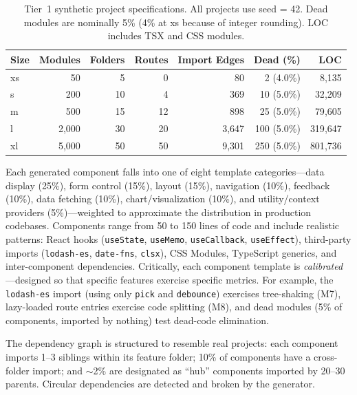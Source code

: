 \documentclass[preprint,12pt]{elsarticle}
\begin{document}
\begin{table}[htbp]
\centering
\caption{Tier~1 synthetic project specifications. All projects use seed = 42. Dead modules are nominally 5\% (4\% at xs because of integer rounding). LOC includes TSX and CSS modules.}\label{tab:projects}
\begin{tabular}{@{}lrrrrrr@{}}
\toprule
\textbf{Size} & \textbf{Modules} & \textbf{Folders} & \textbf{Routes} & \textbf{Import Edges} & \textbf{Dead (\%)} & \textbf{LOC} \\
\midrule
xs   &     50 &  5 &   0 &     80 &  2 (4.0\%) &    8{,}135 \\
s    &    200 & 10 &   4 &    369 & 10 (5.0\%) &   32{,}209 \\
m    &    500 & 15 &  12 &    898 & 25 (5.0\%) &   79{,}605 \\
l    &  2{,}000 & 30 &  20 &  3{,}647 & 100 (5.0\%) &  319{,}647 \\
xl   &  5{,}000 & 50 &  50 &  9{,}301 & 250 (5.0\%) &  801{,}736 \\
\bottomrule
\end{tabular}
\end{table}

Each generated component falls into one of eight template categories---data display (25\%), form control (15\%), layout (15\%), navigation (10\%), feedback (10\%), data fetching (10\%), chart/visualization (10\%), and utility/context providers (5\%)---weighted to approximate the distribution in production codebases.
Components range from 50 to 150 lines of code and include realistic patterns: React hooks (\texttt{useState}, \texttt{useMemo}, \texttt{useCallback}, \texttt{useEffect}), third-party imports (\texttt{lodash-es}, \texttt{date-fns}, \texttt{clsx}), CSS Modules, TypeScript generics, and inter-component dependencies.
Critically, each component template is \emph{calibrated}---designed so that specific features exercise specific metrics.
For example, the \texttt{lodash-es} import (using only \texttt{pick} and \texttt{debounce}) exercises tree-shaking (M7), lazy-loaded route entries exercise code splitting (M8), and dead modules (5\% of components, imported by nothing) test dead-code elimination.

The dependency graph is structured to resemble real projects: each component imports 1--3 siblings within its feature folder; 10\% of components have a cross-folder import; and $\sim$2\% are designated as ``hub'' components imported by 20--30 parents.
Circular dependencies are detected and broken by the generator.
\end{document}
